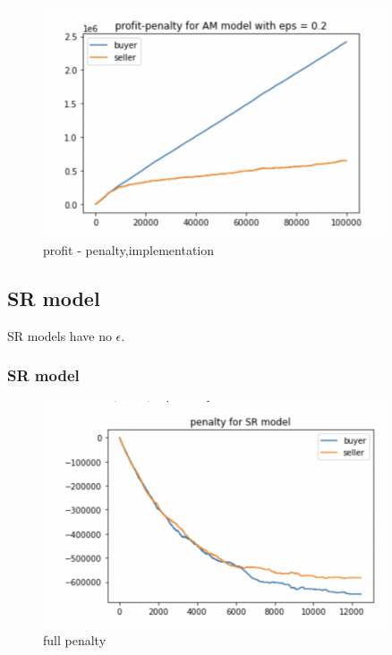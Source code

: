 \documentclass[11pt]{article}
\begin{document}
\begin{figure}[H]
	\begin{center}
	\includegraphics[width=0.9\textwidth]{54.PNG}
	\end{center}
	\caption{profit - penalty,implementation}
	\label{FIG.54}
\end{figure}

\subsection{SR model}
SR models have no $\epsilon$.

\subsubsection{SR model}

\begin{figure}[H]
	\begin{center}
	\includegraphics[width=0.9\textwidth]{55.PNG}
	\end{center}
	\caption{full penalty}
	\label{FIG.55}
\end{figure}
\end{document}
